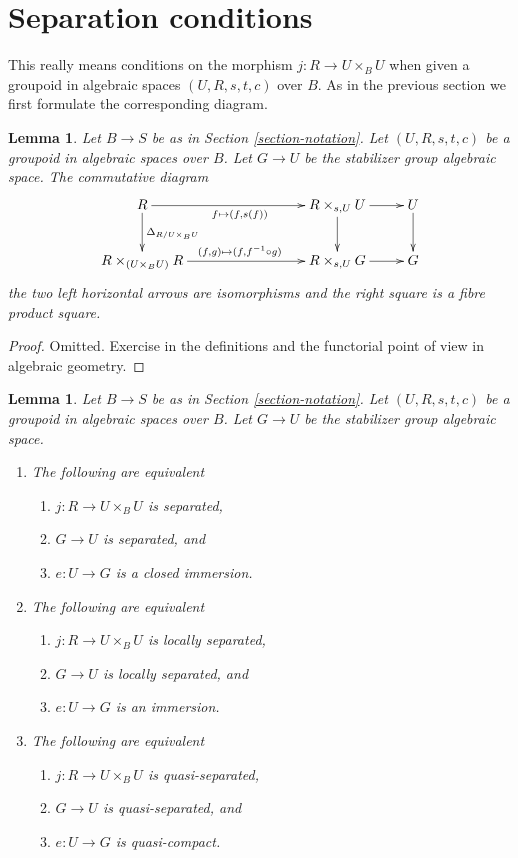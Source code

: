 \documentclass{stacks-project}
\theoremstyle{plain}
\newtheorem{lemma}[subsection]{Lemma}
\theoremstyle{definition}
\theoremstyle{remark}
\numberwithin{equation}{subsection}
\begin{document}
\section{Separation conditions}
\label{section-separation}

\noindent
This really means conditions on the morphism $j : R \to U \times_B U$
when given a groupoid in algebraic spaces $(U, R, s, t, c)$ over $B$.
As in the previous section we first formulate the corresponding diagram.

\begin{lemma}
\label{lemma-diagram-diagonal}
Let $B \to S$ be as in Section \ref{section-notation}.
Let $(U, R, s, t, c)$ be a groupoid in algebraic spaces over $B$.
Let $G \to U$ be the stabilizer group algebraic space.
The commutative diagram
$$
\xymatrix{
R \ar[d]^{\Delta_{R/U \times_B U}} \ar[rrr]_{f \mapsto (f, s(f))} & & &
R \times_{s, U} U \ar[d] \ar[r] & U \ar[d] \\
R \times_{(U \times_B U)} R \ar[rrr]^{(f, g) \mapsto (f, f^{-1} \circ g)} & & &
R \times_{s, U} G \ar[r] & G
}
$$
the two left horizontal arrows are isomorphisms
and the right square is a fibre product square.
\end{lemma}

\begin{proof}
Omitted.
Exercise in the definitions and the functorial point of
view in algebraic geometry.
\end{proof}

\begin{lemma}
\label{lemma-diagonal}
Let $B \to S$ be as in Section \ref{section-notation}.
Let $(U, R, s, t, c)$ be a groupoid in algebraic spaces over $B$.
Let $G \to U$ be the stabilizer group algebraic space.
\begin{enumerate}
\item The following are equivalent
\begin{enumerate}
\item $j : R \to U \times_B U$ is separated,
\item $G \to U$ is separated, and
\item $e : U \to G$ is a closed immersion.
\end{enumerate}
\item The following are equivalent
\begin{enumerate}
\item $j : R \to U \times_B U$ is locally separated,
\item $G \to U$ is locally separated, and
\item $e : U \to G$ is an immersion.
\end{enumerate}
\item The following are equivalent
\begin{enumerate}
\item $j : R \to U \times_B U$ is quasi-separated,
\item $G \to U$ is quasi-separated, and
\item $e : U \to G$ is quasi-compact.
\end{enumerate}
\end{enumerate}
\end{lemma}
\end{document}
